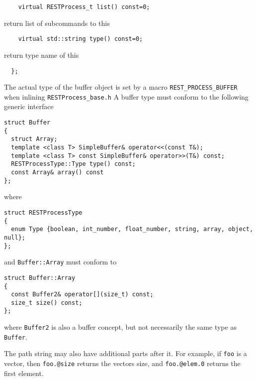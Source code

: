 \begin{verbatim}
    virtual RESTProcess_t list() const=0;
\end{verbatim}
return list of subcommands to this

\begin{verbatim}
    virtual std::string type() const=0;
\end{verbatim}
return type name of this

\begin{verbatim}
  };
\end{verbatim}

\label{buffer concept}

The actual type of
the buffer object is set by a macro \verb+REST_PROCESS_BUFFER+ when
inlining \verb+RESTProcess_base.h+ A buffer type must conform to the
following generic interface
\begin{verbatim}
struct Buffer
{
  struct Array;
  template <class T> SimpleBuffer& operator<<(const T&);
  template <class T> const SimpleBuffer& operator>>(T&) const;
  RESTProcessType::Type type() const;
  const Array& array() const
};
\end{verbatim}
where
\begin{verbatim}
struct RESTProcessType
{
  enum Type {boolean, int_number, float_number, string, array, object, null};
};
\end{verbatim}
and \verb+Buffer::Array+ must conform to
\begin{verbatim}
struct Buffer::Array
{
  const Buffer2& operator[](size_t) const;
  size_t size() const;
};
\end{verbatim}
where \verb+Buffer2+ is also a buffer concept, but not necessarily the
same type as \verb+Buffer+.


The path string may also have additional parts after it. For example,
if \verb+foo+ is a vector, then \verb+foo.@size+ returns the vectors
size, and \verb+foo.@elem.0+ returns the first element.

